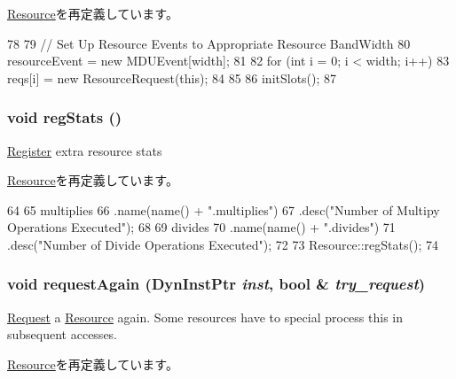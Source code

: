 \hyperlink{classResource_a02fd73d861ef2e4aabb38c0c9ff82947}{Resource}を再定義しています。


\begin{DoxyCode}
78 {
79     // Set Up Resource Events to Appropriate Resource BandWidth
80     resourceEvent = new MDUEvent[width];
81 
82     for (int i = 0; i < width; i++) {
83         reqs[i] = new ResourceRequest(this);
84     }
85 
86     initSlots();
87 }
\end{DoxyCode}
\hypertarget{classMultDivUnit_a4dc637449366fcdfc4e764cdf12d9b11}{
\subsubsection[{regStats}]{\setlength{\rightskip}{0pt plus 5cm}void regStats ()}}
\label{classMultDivUnit_a4dc637449366fcdfc4e764cdf12d9b11}
\hyperlink{classRegister}{Register} extra resource stats 

\hyperlink{classResource_ac1739a9be0fbd5d96cf441cd3b2c1c78}{Resource}を再定義しています。


\begin{DoxyCode}
64 {
65     multiplies
66         .name(name() + ".multiplies")
67         .desc("Number of Multipy Operations Executed");
68 
69     divides
70         .name(name() + ".divides")
71         .desc("Number of Divide Operations Executed");
72 
73     Resource::regStats();
74 }
\end{DoxyCode}
\hypertarget{classMultDivUnit_a9063fd6f97e36e3565247339ffa3882c}{
\subsubsection[{requestAgain}]{\setlength{\rightskip}{0pt plus 5cm}void requestAgain ({\bf DynInstPtr} {\em inst}, \/  bool \& {\em try\_\-request})}}
\label{classMultDivUnit_a9063fd6f97e36e3565247339ffa3882c}
\hyperlink{classRequest}{Request} a \hyperlink{classResource}{Resource} again. Some resources have to special process this in subsequent accesses. 

\hyperlink{classResource_a9063fd6f97e36e3565247339ffa3882c}{Resource}を再定義しています。


